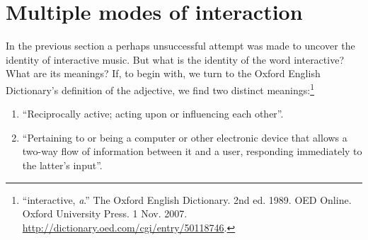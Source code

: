 \section{Multiple modes of interaction}
\label{sec:inter-defin}

In the previous section a perhaps unsuccessful attempt was made to uncover the identity of interactive music. But what is the identity of the word interactive? What are its meanings? If, to begin with, we turn to the Oxford English Dictionary's definition of the adjective, we find two distinct meanings:\footnote{``interactive, \textit{a}.'' The Oxford English Dictionary. 2nd ed. 1989. OED Online. Oxford University Press. 1 Nov. 2007. \url{http://dictionary.oed.com/cgi/entry/50118746}.}
\begin{enumerate}
\label{interaction:item:1}\item ``Reciprocally active; acting upon or influencing each other''.
\label{interaction:item:2}\item ``Pertaining to or being a computer or other electronic device that allows a two-way flow of information between it and a user, responding immediately to the latter's input''.
\end{enumerate}

